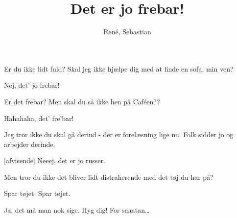 \documentclass[a4paper,11pt]{article}
\title{Det er jo frebar!}
\author{René, Sebastian}
\begin{document}
\maketitle




\begin{sketch}


 Er du ikke lidt fuld? Skal jeg ikke hjælpe dig med at finde en sofa, min ven?

 Nej, det' jo frebar!

 Er det frebar? Men skal du så ikke hen på Caféen??

 Hahahaha, det' fre'bar!


 Jeg tror ikke du skal gå derind - der er forelæsning lige nu. Folk sidder jo og arbejder derinde.

[afvisende] Neeej, det er jo russer.

 Men tror du ikke det bliver lidt distraherende med det tøj du har på?


 Spar tøjet. Spar tøjet.



 Ja, det må man nok sige. Hyg dig!  For saaatan\ldots

\end{sketch}
\end{document}
